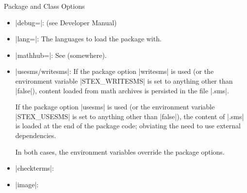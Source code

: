 \documentclass{stex}
\begin{document}
\begin{sfragment}{Package and Class Options}
  
    \begin{itemize}
      \item|debug=|: (see Developer Manual)
      \item|lang=|: The languages to load the 
        package with.
      \item|mathhub=|: See (somewhere).
      \item|usesms/writesms|:
        If the package option |writesms| is used (or the environment
        variable |STEX_WRITESMS| is set to anything other than |false|),
        content loaded from math archives is persisted in the file
        |.sms|.
      
        If the package option |usesms| is used (or the environment
        variable |STEX_USESMS| is set to anything other than |false|),
        the content of |.sms| is loaded at the end
        of the  package code;
        obviating the need to use external dependencies.
      
        In both cases, the environment variables override the package options.
      \item|checkterms|:
      \item|image|:
    \end{itemize}

\end{sfragment}
\end{document}
